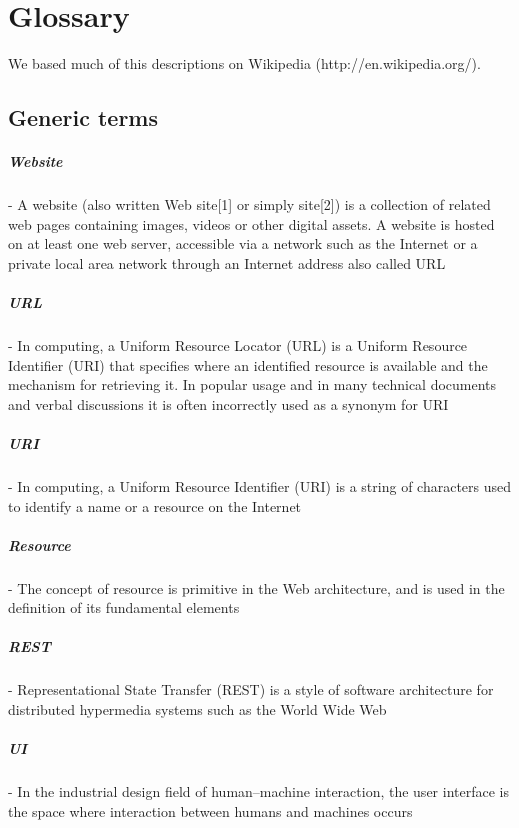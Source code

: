 \chapter{Glossary}
We based much of this descriptions on Wikipedia (http://en.wikipedia.org/).

\section{Generic terms}
\paragraph{Website} - A website (also written Web site[1] or simply site[2]) is a collection of related web pages containing images, videos or other digital assets. A website is hosted on at least one web server, accessible via a network such as the Internet or a private local area network through an Internet address also called URL
\paragraph{URL} - In computing, a Uniform Resource Locator (URL) is a Uniform Resource Identifier (URI) that specifies where an identified resource is available and the mechanism for retrieving it. In popular usage and in many technical documents and verbal discussions it is often incorrectly used as a synonym for URI
\paragraph{URI} - In computing, a Uniform Resource Identifier (URI) is a string of characters used to identify a name or a resource on the Internet
\paragraph{Resource} - The concept of resource is primitive in the Web architecture, and is used in the definition of its fundamental elements
\paragraph{REST} - Representational State Transfer (REST) is a style of software architecture for distributed hypermedia systems such as the World Wide Web
\paragraph{UI} - In the industrial design field of human–machine interaction, the user interface is the space where interaction between humans and machines occurs
